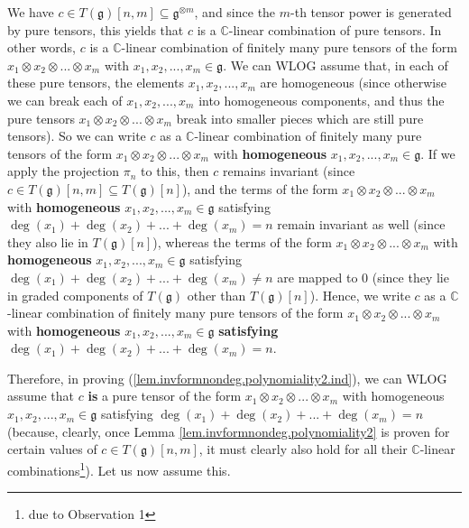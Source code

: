 \documentclass
[numbers=enddot,12pt,final,onecolumn,german,notitlepage]{scrartcl}%
\theoremstyle{definition}
\begin{document}
We have $c\in T\left(  \mathfrak{g}\right)  \left[  n,m\right]  \subseteq
\mathfrak{g}^{\otimes m}$, and since the $m$-th tensor power is generated by
pure tensors, this yields that $c$ is a $\mathbb{C}$-linear combination of
pure tensors. In other words, $c$ is a $\mathbb{C}$-linear combination of
finitely many pure tensors of the form $x_{1}\otimes x_{2}\otimes...\otimes
x_{m}$ with $x_{1},x_{2},...,x_{m}\in\mathfrak{g}$. We can WLOG assume that,
in each of these pure tensors, the elements $x_{1},x_{2},...,x_{m}$ are
homogeneous (since otherwise we can break each of $x_{1},x_{2},...,x_{m}$ into
homogeneous components, and thus the pure tensors $x_{1}\otimes x_{2}%
\otimes...\otimes x_{m}$ break into smaller pieces which are still pure
tensors). So we can write $c$ as a $\mathbb{C}$-linear combination of finitely
many pure tensors of the form $x_{1}\otimes x_{2}\otimes...\otimes x_{m}$ with
\textbf{homogeneous }$x_{1},x_{2},...,x_{m}\in\mathfrak{g}$. If we apply the
projection $\pi_{n}$ to this, then $c$ remains invariant (since $c\in T\left(
\mathfrak{g}\right)  \left[  n,m\right]  \subseteq T\left(  \mathfrak{g}%
\right)  \left[  n\right]  $), and the terms of the form $x_{1}\otimes
x_{2}\otimes...\otimes x_{m}$ with \textbf{homogeneous }$x_{1},x_{2}%
,...,x_{m}\in\mathfrak{g}$ satisfying $\deg\left(  x_{1}\right)  +\deg\left(
x_{2}\right)  +...+\deg\left(  x_{m}\right)  =n$ remain invariant as well
(since they also lie in $T\left(  \mathfrak{g}\right)  \left[  n\right]  $),
whereas the terms of the form $x_{1}\otimes x_{2}\otimes...\otimes x_{m}$ with
\textbf{homogeneous }$x_{1},x_{2},...,x_{m}\in\mathfrak{g}$ satisfying
$\deg\left(  x_{1}\right)  +\deg\left(  x_{2}\right)  +...+\deg\left(
x_{m}\right)  \neq n$ are mapped to $0$ (since they lie in graded components
of $T\left(  \mathfrak{g}\right)  $ other than $T\left(  \mathfrak{g}\right)
\left[  n\right]  $). Hence, we write $c$ as a $\mathbb{C}$-linear combination
of finitely many pure tensors of the form $x_{1}\otimes x_{2}\otimes...\otimes
x_{m}$ with \textbf{homogeneous }$x_{1},x_{2},...,x_{m}\in\mathfrak{g}$
\textbf{satisfying} $\deg\left(  x_{1}\right)  +\deg\left(  x_{2}\right)
+...+\deg\left(  x_{m}\right)  =n$.

Therefore, in proving (\ref{lem.invformnondeg.polynomiality2.ind}), we can
WLOG assume that $c$ \textbf{is} a pure tensor of the form $x_{1}\otimes
x_{2}\otimes...\otimes x_{m}$ with homogeneous\textbf{ }$x_{1},x_{2}%
,...,x_{m}\in\mathfrak{g}$ satisfying $\deg\left(  x_{1}\right)  +\deg\left(
x_{2}\right)  +...+\deg\left(  x_{m}\right)  =n$ (because, clearly, once Lemma
\ref{lem.invformnondeg.polynomiality2} is proven for certain values of $c\in
T\left(  \mathfrak{g}\right)  \left[  n,m\right]  $, it must clearly also hold
for all their $\mathbb{C}$-linear combinations\footnote{due to Observation
1}). Let us now assume this.
\end{document}
